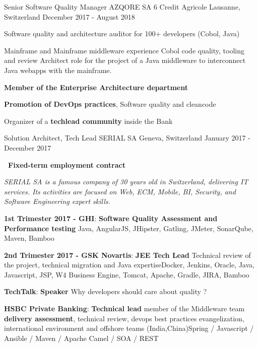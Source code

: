 \begin{cventries}
    \cventry
    {Senior Software Quality Manager} %
    {AZQORE SA 6 Credit Agricole} %
    {Lausanne, Switzerland} %
    {December 2017 - August 2018} %
    {
        \begin{cvitems} %
            \item{Software quality and architecture auditor for 100+ developers (Cobol, Java)}
            \item {Mainframe and Mainframe middleware experience}
            \subitem Cobol code quality, tooling and review
            \subitem Architect role for the project of a Java middleware to interconnect Java webapps with the mainframe.
            \item{\textbf{Member of the Enterprise Architecture department}}
            \item {\textbf{Promotion of DevOps practices}, Software quality and cleancode}
            \item {Organizer of a \textbf{techlead community }inside the Bank}
        \end{cvitems}
    }

    \cventry
    {Solution Architect, Tech Lead} %
    {SERIAL SA} %
    {Geneva, Switzerland} %
    {January 2017 - December 2017} %
    {
        \begin{cvitems} %
            \item{\textbf{\faFlagO\  Fixed-term employment contract}}
            \item {\textit{SERIAL SA is a famous company of 30 years old in Switzerland, delivering IT services. Its activities are focused on Web, ECM, Mobile, BI, Security, and Software Engineering expert skills.}}
            \item { \textbf{1st Trimester 2017 - GHI}: \textbf{Software Quality Assessment and Performance testing} \newline Java, AngularJS, JHipster, Gatling, JMeter, SonarQube, Maven, Bamboo}
            \item { \textbf{2nd Trimester 2017 - GSK Novartis}: \textbf{JEE Tech Lead} \newline Technical review of the project, technical migration and Java expertise\newline Docker, Jenkins, Oracle, Java, Javascript, JSP, W4 Business Engine, Tomcat, Apache, Gradle, JIRA, Bamboo}
            \item { \textbf{TechTalk}: \textbf{Speaker} \newline Why developers should care about quality ?}
            \item { \textbf{HSBC Private Banking}: \textbf{Technical lead} \newline member of the Middleware team  \textbf{delivery assessment}, technical review, devops best practices evangelization, international environment and offshore teams (India,China)\newline Spring / Javascript / Ansible / Maven / Apache Camel / SOA / REST}
        \end{cvitems}
    }


\end{cventries}
